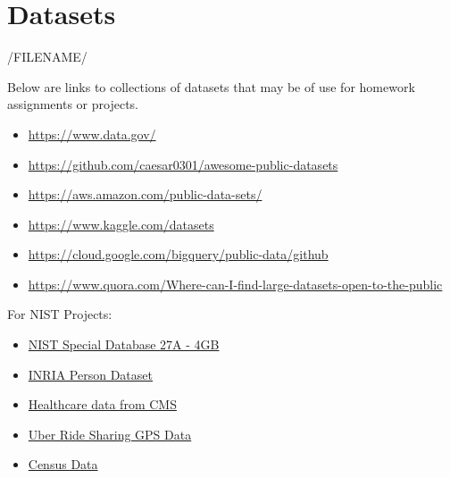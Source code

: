 \section{Datasets}\label{datasets}
/FILENAME/

Below are links to collections of datasets that may be of use for
homework assignments or projects.

\begin{itemize}

\item
  \url{https://www.data.gov/}
\item
  \url{https://github.com/caesar0301/awesome-public-datasets}
\item
  \url{https://aws.amazon.com/public-data-sets/}
\item
  \url{https://www.kaggle.com/datasets}
\item
  \url{https://cloud.google.com/bigquery/public-data/github}
\item
  \url{https://www.quora.com/Where-can-I-find-large-datasets-open-to-the-public}
\end{itemize}

For NIST Projects:

\begin{itemize}

\item
  \href{http://www.nist.gov/itl/iad/ig/sd27a.cfm}{NIST Special Database
  27A - 4GB}
\item
  \href{http://pascal.inrialpes.fr/data/human/}{INRIA Person Dataset}
\item
  \href{https://www.cms.gov/Research-Statistics-Data-and-Systems/Downloadable-Public-Use-Files/Part-B-National-Summary-Data-File/Overview.html}{Healthcare
  data from CMS}
\item
  \href{https://github.com/fivethirtyeight/uber-tlc-foil-response}{Uber
  Ride Sharing GPS Data}
\item
  \href{http://www.census.gov/population/www/cen2010/glance/}{Census
  Data}
\end{itemize}
